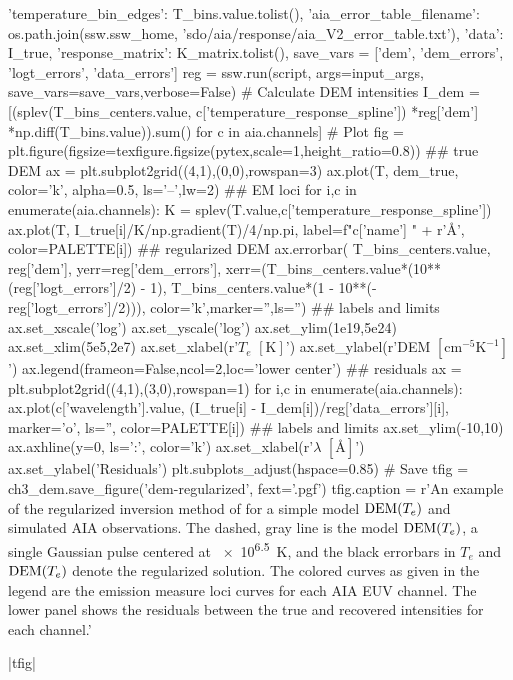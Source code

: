 \begin{pycode}
{    'temperature_bin_edges': T_bins.value.tolist(),
    'aia_error_table_filename': os.path.join(ssw.ssw_home, 'sdo/aia/response/aia_V2_error_table.txt'),
    'data': I_true,
    'response_matrix': K_matrix.tolist(),
}
save_vars = ['dem', 'dem_errors', 'logt_errors', 'data_errors']
reg = ssw.run(script, args=input_args, save_vars=save_vars,verbose=False)
# Calculate DEM intensities
I_dem = [(splev(T_bins_centers.value, c['temperature_response_spline'])
          *reg['dem']
          *np.diff(T_bins.value)).sum() for c in aia.channels]
# Plot
fig = plt.figure(figsize=texfigure.figsize(pytex,scale=1,height_ratio=0.8))
## true DEM
ax = plt.subplot2grid((4,1),(0,0),rowspan=3)
ax.plot(T, dem_true, color='k', alpha=0.5, ls='--',lw=2)
## EM loci
for i,c in enumerate(aia.channels):
    K = splev(T.value,c['temperature_response_spline'])
    ax.plot(T, I_true[i]/K/np.gradient(T)/4/np.pi, 
            label=f"{c['name']} " + r'\si{\angstrom}', color=PALETTE[i])
## regularized DEM
ax.errorbar(
    T_bins_centers.value, reg['dem'], 
    yerr=reg['dem_errors'],
    xerr=(T_bins_centers.value*(10**(reg['logt_errors']/2) - 1),
          T_bins_centers.value*(1 - 10**(-reg['logt_errors']/2))),
    color='k',marker='',ls='')
## labels and limits
ax.set_xscale('log')
ax.set_yscale('log')
ax.set_ylim(1e19,5e24)
ax.set_xlim(5e5,2e7)
ax.set_xlabel(r'$T_e$ $[\si{\kelvin}]$')
ax.set_ylabel(r'DEM $[\si{\cm\tothe{-5}\kelvin\tothe{-1}}]$')
ax.legend(frameon=False,ncol=2,loc='lower center')
## residuals
ax = plt.subplot2grid((4,1),(3,0),rowspan=1)
for i,c in enumerate(aia.channels):
    ax.plot(c['wavelength'].value, (I_true[i] - I_dem[i])/reg['data_errors'][i],
            marker='o', ls='', color=PALETTE[i])
## labels and limits
ax.set_ylim(-10,10)
ax.axhline(y=0, ls=':', color='k')
ax.set_xlabel(r'$\lambda$ $[\si{\angstrom}]$')
ax.set_ylabel('Residuals')
plt.subplots_adjust(hspace=0.85)
# Save
tfig = ch3_dem.save_figure('dem-regularized', fext='.pgf')
tfig.caption = r'An example of the regularized inversion method of \citet{hannah_differential_2012} for a simple model $\textup{DEM}(T_e)$ and simulated AIA observations. The dashed, gray line is the model $\textup{DEM}(T_e)$, a single Gaussian pulse centered at \SI{e6.5}{\kelvin}, and the black errorbars in $T_e$ and $\textup{DEM}(T_e)$ denote the regularized solution. The colored curves as given in the legend are the emission measure loci curves for each AIA EUV channel. The lower panel shows the residuals between the true and recovered intensities for each channel.'
\end{pycode}
|tfig|

